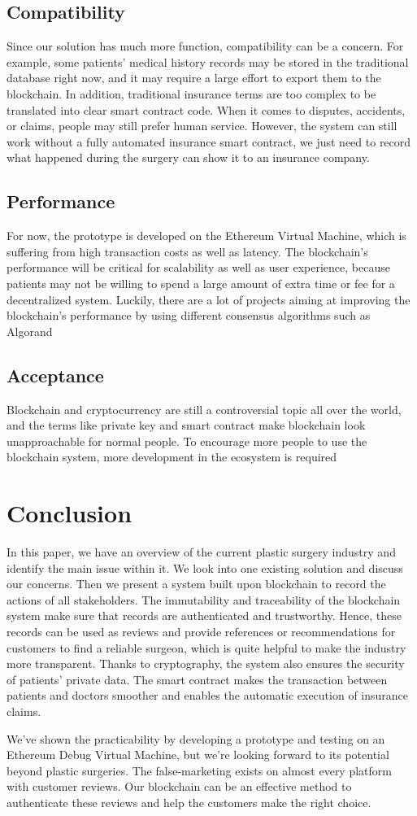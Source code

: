 \documentclass{article}
\begin{document}
\subsection{Compatibility}
Since our solution has much more function, compatibility can be a concern. For example, some patients' medical history records may be stored in the traditional database right now, and it may require a large effort to export them to the blockchain. In addition, traditional insurance terms are too complex to be translated into clear smart contract code. When it comes to disputes, accidents, or claims, people may still prefer human service. However, the system can still work without a fully automated insurance smart contract, we just need to record what happened during the surgery can show it to an insurance company. 
\subsection{Performance}
For now, the prototype is developed on the Ethereum Virtual Machine, which is suffering from high transaction costs as well as latency. The blockchain's performance will be critical for scalability as well as user experience, because patients may not be willing to spend a large amount of extra time or fee for a decentralized system. Luckily, there are a lot of projects aiming at improving the blockchain's performance by using different consensus algorithms such as Algorand\cite{algorand}
\subsection{Acceptance}
Blockchain and cryptocurrency are still a controversial topic all over the world, and the terms like private key and smart contract make blockchain look unapproachable for normal people. To encourage more people to use the blockchain system, more development in the ecosystem is required
\section{Conclusion}
In this paper, we have an overview of the current plastic surgery industry and identify the main issue within it. We look into one existing solution and discuss our concerns. Then we present a system built upon blockchain to record the actions of all stakeholders. The immutability and traceability of the blockchain system make sure that records are authenticated and trustworthy. Hence, these records can be used as reviews and provide references or recommendations for customers to find a reliable surgeon, which is quite helpful to make the industry more transparent. Thanks to cryptography, the system also ensures the security of patients' private data. The smart contract makes the transaction between patients and doctors smoother and enables the automatic execution of insurance claims.
\par We've shown the practicability by developing a prototype and testing on an Ethereum Debug Virtual Machine, but we're looking forward to its potential beyond plastic surgeries. The false-marketing exists on almost every platform with customer reviews. Our blockchain can be an effective method to authenticate these reviews and help the customers make the right choice.
\end{document}
